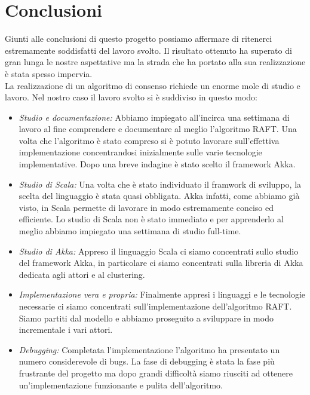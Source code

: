 \chapter{Conclusioni}
Giunti alle conclusioni di questo progetto possiamo affermare di ritenerci estremamente soddisfatti del lavoro svolto. Il risultato ottenuto ha superato di gran lunga le nostre aspettative ma la strada che ha portato alla sua realizzazione è stata spesso impervia.\\
La realizzazione di un algoritmo di consenso richiede un enorme mole di studio e lavoro. Nel nostro caso il lavoro svolto si è suddiviso in questo modo: 
\begin{itemize}
  \item{\emph{Studio e documentazione:}}
  Abbiamo impiegato all'incirca una settimana di lavoro al fine comprendere e documentare al meglio l'algoritmo RAFT. Una volta che l'algoritmo è stato compreso si è potuto lavorare sull'effettiva implementazione concentrandosi inizialmente sulle varie tecnologie implementative. Dopo una breve indagine è stato scelto il framework Akka.
  \item{\emph{Studio di Scala:}}
  Una volta che è stato individuato il framwork di sviluppo, la scelta del linguaggio è stata quasi obbligata. Akka infatti, come abbiamo già visto, in Scala permette di lavorare in modo estremamente conciso ed efficiente. Lo studio di Scala non è stato immediato e per apprenderlo al meglio abbiamo impiegato una settimana di studio full-time.
  \item{\emph{Studio di Akka:}}
  Appreso il linguaggio Scala ci siamo concentrati sullo studio del framework Akka, in particolare ci siamo concentrati sulla libreria di Akka dedicata agli attori e al clustering.
  \item{\emph{Implementazione vera e propria:}}
  Finalmente appresi i linguaggi e le tecnologie necessarie ci siamo concentrati sull'implementazione dell'algoritmo RAFT. Siamo partiti dal modello e abbiamo proseguito a sviluppare in modo incrementale i vari attori.
  \item{\emph{Debugging:}}
  Completata l'implementazione l'algoritmo ha presentato un numero considerevole di bugs. La fase di debugging è stata la fase più frustrante del progetto ma dopo grandi difficoltà siamo riusciti ad ottenere un'implementazione funzionante e pulita dell'algoritmo.
\end{itemize}


